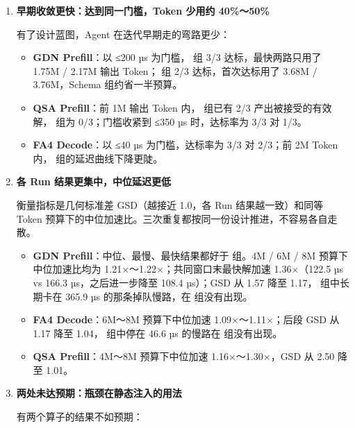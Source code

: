 \begin{enumerate}[start=1]
\item
\textbf{早期收敛更快：达到同一门槛，Token 少用约 40\%～50\%}


有了设计蓝图，Agent 在迭代早期走的弯路更少：


\begin{itemize}
\item
\textbf{GDN Prefill}：以 ≤200 µs 为门槛， 组 3/3 达标，最快两路只用了 1.75M / 2.17M 输出 Token； 组 2/3 达标，首次达标用了 3.68M / 3.76M，Schema 组约省一半预算。


\item
\textbf{QSA Prefill}：前 1M 输出 Token 内， 组已有 2/3 产出被接受的有效解， 组为 0/3；门槛收紧到 ≤350 µs 时，达标率为 3/3 对 1/3。


\item
\textbf{FA4 Decode}：以 ≤40 µs 为门槛，达标率为 3/3 对 2/3；前 2M Token 内， 组的延迟曲线下降更陡。


\end{itemize}
\item
\textbf{各 Run 结果更集中，中位延迟更低}


衡量指标是几何标准差 GSD（越接近 1.0，各 Run 结果越一致）和同等 Token 预算下的中位加速比。三次重复都按同一份设计推进，不容易各自走散。


\begin{itemize}
\item
\textbf{GDN Prefill}：中位、最慢、最快结果都好于  组。4M / 6M / 8M 预算下中位加速比均为 1.21×～1.22×；共同窗口末最快解加速 1.36×（122.5 µs vs 166.3 µs，之后进一步降至 108.4 µs）；GSD 从 1.57 降至 1.17， 组中长期卡在 365.9 µs 的那条掉队慢路，在  组没有出现。


\item
\textbf{FA4 Decode}：6M～8M 预算下中位加速 1.09×～1.11×；后段 GSD 从 1.17 降至 1.04， 组中停在 46.6 µs 的慢路在  组没有出现。


\item
\textbf{QSA Prefill}：4M～8M 预算下中位加速 1.16×～1.30×，GSD 从 2.50 降至 1.01。


\end{itemize}
\item
\textbf{两处未达预期：瓶颈在静态注入的用法}


有两个算子的结果不如预期：



\end{enumerate}
